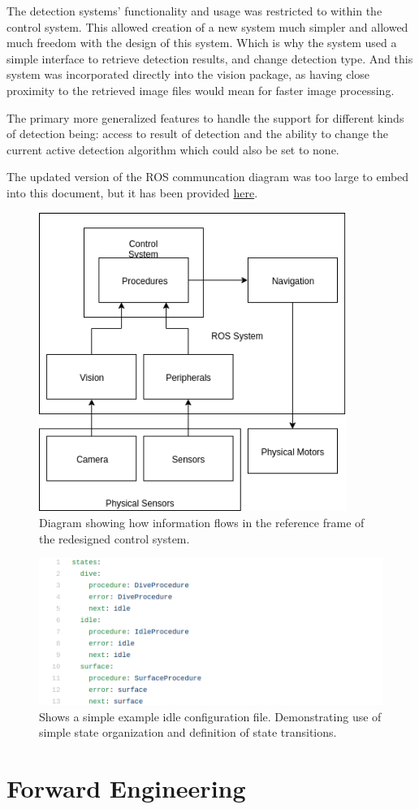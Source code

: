The detection systems' functionality and usage was restricted to within the control system. This allowed creation of a new system much simpler and allowed much freedom with the design of this system. Which is why the system used a simple interface to retrieve detection results, and change detection type. And this system was incorporated directly into the vision package, as having close proximity to the retrieved image files would mean for faster image processing.

The primary more generalized features to handle the support for different kinds of detection being: access to result of detection and the ability to change the current active detection algorithm which could also be set to none.

The updated version of the ROS communcation diagram was too large to embed into
this document, but it has been provided \href{https://drive.google.com/file/d/1_vJLSflxahA-7v2kYGV3wu5SfGcKEVf8/view?usp=sharing}{here}.

\begin{figure}
\centering
\includegraphics[width=100mm]{Figures/InformationFlowNew}
\decoRule
\caption[New Information Flow]{Diagram showing how information flows in the reference frame of the redesigned control system.}
\label{fig:InformationFlowNew}
\end{figure}

\begin{figure}
\centering
\includegraphics[width=150mm]{Figures/ExampleConfig}
\decoRule
\caption[Example Configuration File]{Shows a simple example idle configuration file. Demonstrating use of simple state organization and definition of state transitions.}
\label{fig:ExampleConfig}
\end{figure}

\section{Forward Engineering}

